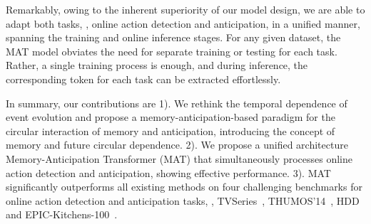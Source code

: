 Remarkably, owing to the inherent superiority of our model design, we are able to adapt both tasks, \ie, online action detection and anticipation, in a unified manner, spanning the training and online inference stages. For any given dataset, the MAT model obviates the need for separate training or testing for each task. Rather, a single training process is enough, and during inference, the corresponding token for each task can be extracted effortlessly.


In summary, our contributions are 1). We rethink the temporal dependence of event evolution and propose a memory-anticipation-based paradigm for the circular interaction of memory and anticipation, introducing the concept of memory and future circular dependence.
2). We propose a unified architecture Memory-Anticipation Transformer (MAT) that simultaneously processes online action detection and anticipation, showing effective performance. 3). MAT significantly outperforms all existing methods on four challenging benchmarks for online action detection and anticipation tasks, \ie, TVSeries~\cite{oad2016}, THUMOS'14~\cite{THUMOS14}, HDD~\cite{hdd} and EPIC-Kitchens-100~\cite{ek100}.

